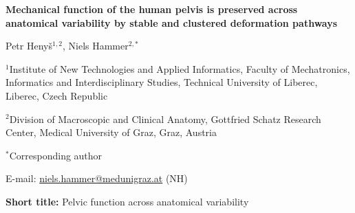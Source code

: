 \documentclass[11pt]{article}
\newcommand{\ManuscriptTitle}{Mechanical function of the human pelvis is preserved across anatomical variability by stable and clustered deformation pathways}
\newcommand{\ShortTitle}{Pelvic function across anatomical variability}
\begin{document}
\begin{flushleft}
{\LARGE\bfseries \ManuscriptTitle\par}
\vspace{1.5em}
{\normalsize Petr Heny\v{s}$^{1,2}$, Niels Hammer$^{2,*}$\par}
\vspace{0.75em}
{\small $^{1}$Institute of New Technologies and Applied Informatics, Faculty of Mechatronics, Informatics and Interdisciplinary Studies, Technical University of Liberec, Liberec, Czech Republic\par}
{\small $^{2}$Division of Macroscopic and Clinical Anatomy, Gottfried Schatz Research Center, Medical University of Graz, Graz, Austria\par}
\vspace{0.75em}
{\small $^{*}$Corresponding author\par}
{\small E-mail: \href{mailto:niels.hammer@medunigraz.at}{niels.hammer@medunigraz.at} (NH)\par}
\vspace{0.75em}
{\small \textbf{Short title:} \ShortTitle\par}
\end{flushleft}

\clearpage


\end{document}
